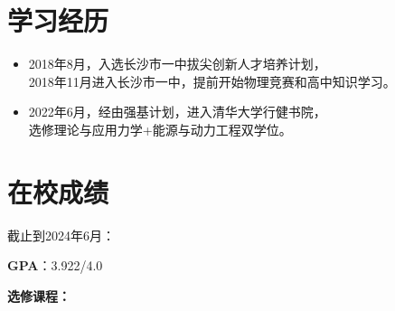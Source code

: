 \documentclass{resume}
\begin{document}




\sepspace
{}


\section{学习经历}
\begin{itemize}
  \item 2018年8月，入选长沙市一中拔尖创新人才培养计划，\\2018年11月进入长沙市一中，提前开始物理竞赛和高中知识学习。
  \item 2022年6月，经由强基计划，进入清华大学行健书院，\\选修理论与应用力学+能源与动力工程双学位。
\end{itemize}

\section{在校成绩}
截止到2024年6月：

\qquad \qquad \textbf{GPA}：3.922/4.0 

\sepspace

\textbf{选修课程：}
  
\end{document}
